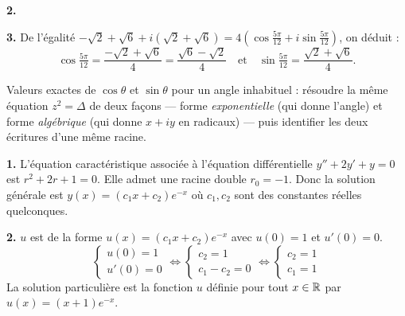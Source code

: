 \documentclass[11pt]{article}
\begin{document}
\textbf{2.}
\begin{center}
\end{center}

\textbf{3.} De l'égalité $-\sqrt{2} + \sqrt{6} + i(\sqrt{2} + \sqrt{6}) = 4\left(\cos\tfrac{5\pi}{12} + i\sin\tfrac{5\pi}{12}\right)$, on déduit :
\[ \cos\tfrac{5\pi}{12} = \frac{-\sqrt{2} + \sqrt{6}}{4} = \frac{\sqrt{6} - \sqrt{2}}{4} \quad \text{et} \quad \sin\tfrac{5\pi}{12} = \frac{\sqrt{2} + \sqrt{6}}{4}. \]

\begin{methode}
Valeurs exactes de $\cos\theta$ et $\sin\theta$ pour un angle
inhabituel : résoudre la même équation $z^2 = \Delta$ de deux façons —
forme \emph{exponentielle} (qui donne l'angle) et forme
\emph{algébrique} (qui donne $x + iy$ en radicaux) — puis identifier
les deux écritures d'une même racine.
\end{methode}

\prob{}

\textbf{1.} L'équation caractéristique associée à l'équation différentielle $y'' + 2y' + y = 0$ est $r^2 + 2r + 1 = 0$. Elle admet une racine double $r_0 = -1$. Donc la solution générale est $y(x) = (c_1 x + c_2)e^{-x}$ où $c_1, c_2$ sont des constantes réelles quelconques.

\textbf{2.} $u$ est de la forme $u(x) = (c_1 x + c_2)e^{-x}$ avec $u(0) = 1$ et $u'(0) = 0$.
\[ \begin{cases} u(0) = 1 \\ u'(0) = 0 \end{cases} \Longleftrightarrow \begin{cases} c_2 = 1 \\ c_1 - c_2 = 0 \end{cases} \Longleftrightarrow \begin{cases} c_2 = 1 \\ c_1 = 1 \end{cases} \]
La solution particulière est la fonction $u$ définie pour tout $x \in \mathbb{R}$ par $u(x) = (x + 1)e^{-x}$.
\end{document}
